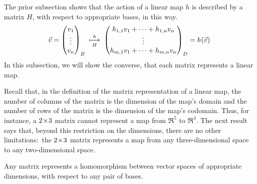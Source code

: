 
The prior subsection shows that
the action of a linear map $h$ is described by a matrix $H$,
with respect to appropriate bases, in this way.
\begin{equation*}
 \vec{v}=\begin{pmatrix} v_1 \\ \vdots \\ v_n \end{pmatrix}_B
  \;\overset{h}{\underset{H}{\longmapsto}}\;
  \begin{pmatrix} h_{1,1}v_1+\dots+h_{1,n}v_n \\ 
                     \vdots                      \\
                     h_{m,1}v_1+\dots+h_{m,n}v_n \end{pmatrix}_D
  =h(\vec{v})
\end{equation*}
In this subsection, we will show the converse, that
each matrix represents a linear map.

Recall that, in the definition of the matrix representation of a linear map,
the number of columns of the matrix is the dimension of the map's
domain and the number of rows of the matrix is the dimension of the 
map's codomain.
Thus, for instance,
a \( 2 \! \times \! 3 \) matrix cannot represent a map from \( \Re^5 \) to
\( \Re^4 \).
The next result says that, beyond this restriction on the dimensions, 
there are no other limitations:~the
\( 2 \! \times \! 3 \) matrix represents a map from any
three-dimensional space to any two-dimensional space. 

\begin{theorem}
\label{th:MatIsLinMap}
Any matrix represents a homomorphism between vector spaces of
appropriate dimensions, with respect to any pair of bases.
\end{theorem}


